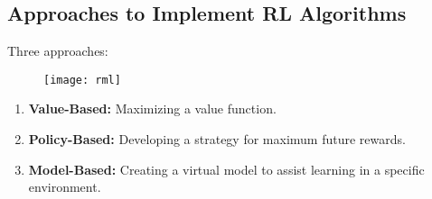 \subsection*{Approaches to Implement RL Algorithms}
Three approaches:

\begin{figure}[h]
\texttt{[image: rml]}\\
\centering
\end{figure}
\begin{enumerate}
    \item \textbf{Value-Based:} Maximizing a value function.
    \item \textbf{Policy-Based:} Developing a strategy for maximum future rewards.
    \item \textbf{Model-Based:} Creating a virtual model to assist learning in a specific environment.
\end{enumerate}

